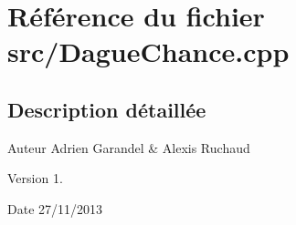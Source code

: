 \section{Référence du fichier src/\-Dague\-Chance.cpp}
\label{_dague_chance_8cpp}


\subsection{Description détaillée}
\begin{DoxyAuthor}{Auteur}
Adrien Garandel \& Alexis Ruchaud 
\end{DoxyAuthor}
\begin{DoxyVersion}{Version}
1. 
\end{DoxyVersion}
\begin{DoxyDate}{Date}
27/11/2013 
\end{DoxyDate}

